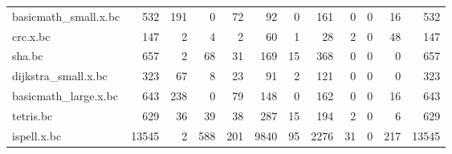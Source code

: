 \begin{table}[ht]
\begin{adjustbox}{width=1.3\textwidth}
\begin{tabular}{lrrrrrrrrrrr}
 basicmath\_small.x.bc &                 532 &                  191 &                          0 &                   72 &                       92 &                                  0 &                           161 &                   0 &                                         0 &                                          16 &                  532 \\
 crc.x.bc             &                 147 &                    2 &                          4 &                    2 &                       60 &                                  1 &                            28 &                   2 &                                         0 &                                          48 &                  147 \\
 sha.bc               &                 657 &                    2 &                         68 &                   31 &                      169 &                                 15 &                           368 &                   0 &                                         0 &                                           0 &                  657 \\
 dijkstra\_small.x.bc  &                 323 &                   67 &                          8 &                   23 &                       91 &                                  2 &                           121 &                   0 &                                         0 &                                           0 &                  323 \\
 basicmath\_large.x.bc &                 643 &                  238 &                          0 &                   79 &                      148 &                                  0 &                           162 &                   0 &                                         0 &                                          16 &                  643 \\
 tetris.bc            &                 629 &                   36 &                         39 &                   38 &                      287 &                                 15 &                           194 &                   2 &                                         0 &                                           6 &                  629 \\
 ispell.x.bc          &               13545 &                    2 &                        588 &                  201 &                     9840 &                                 95 &                          2276 &                  31 &                                         0 &                                         217 &                13545 \\

\end{tabular}
\end{adjustbox}
\end{table}
